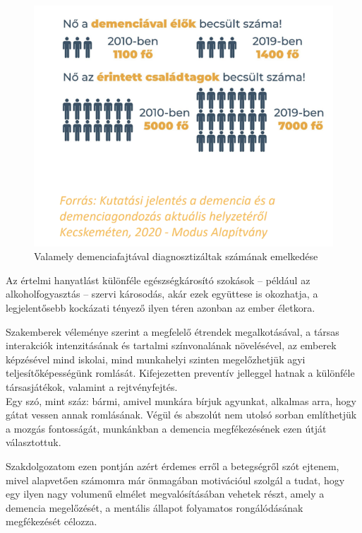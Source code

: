 \documentclass[tocnopagenum]{thesis-ekf}
\begin{document}
	\begin{figure}[h!]
		\centering
		\includegraphics[scale=0.7]{images/demencia.png}
		\caption{Valamely demenciafajtával diagnosztizáltak számának emelkedése}
		\label{fig:demencia}
	\end{figure}
	
	Az értelmi hanyatlást különféle egészségkárosító szokások -- például az alkoholfogyasztás -- szervi károsodás, akár ezek együttese is okozhatja, a legjelentősebb kockázati tényező ilyen téren azonban az ember életkora. 
	
	Szakemberek véleménye szerint a megfelelő étrendek megalkotásával, a társas interakciók intenzitásának és tartalmi színvonalának növelésével, az emberek képzésével mind iskolai, mind munkahelyi szinten megelőzhetjük agyi teljesítőképességünk romlását. 
	Kifejezetten preventív jelleggel hatnak a különféle társasjátékok, valamint a rejtvényfejtés.\\Egy szó, mint száz: bármi, amivel munkára bírjuk agyunkat, alkalmas arra, hogy gátat vessen annak romlásának.
	Végül és abszolút nem utolsó sorban említhetjük a mozgás fontosságát, munkánkban a demencia megfékezésének ezen útját választottuk.
	
	Szakdolgozatom ezen pontján azért érdemes erről a betegségről szót ejtenem, mivel alapvetően számomra már önmagában motivációul szolgál a tudat, hogy egy ilyen nagy volumenű elmélet megvalósításában vehetek részt, amely a demencia megelőzését, a mentális állapot folyamatos rongálódásának megfékezését célozza. 
	\cite{dementia1}
	\cite{dementia2}
	\cite{dementia3}
	
\end{document}
